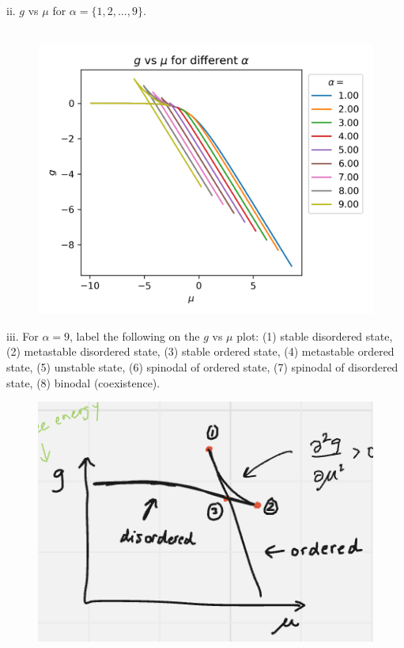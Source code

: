 \documentclass[12pt]{article}
\begin{document}
\subsubsection{}
ii. $g$ vs $\mu$ for $\alpha=\{1,2, \ldots, 9\}$.\\\\
\begin{figure}
  \centering
  \includegraphics[max width=\textwidth]{g-mu.png}
\end{figure}
iii. For $\alpha=9$, label the following on the $g$ vs $\mu$ plot: (1) stable disordered state, (2) metastable disordered state, (3) stable ordered state, (4) metastable ordered state, (5) unstable state, (6) spinodal of ordered state, (7) spinodal of disordered state, (8) binodal (coexistence).
\newpage
\begin{figure}
  \centering
  \includegraphics[max width=\textwidth]{drawing.png}
\end{figure}
\end{document}
